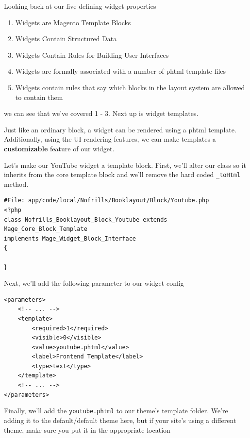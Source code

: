 \documentclass[oneside]{book}
\begin{document}
Looking back at our five defining widget properties

\begin{enumerate}
\item Widgets are Magento Template Blocks
\item Widgets Contain Structured Data
\item Widgets Contain Rules for Building User Interfaces
\item Widgets are formally associated with a number of phtml template files
\item Widgets contain rules that say which blocks in the layout system are allowed to contain them
\end{enumerate}


we can see that we've covered 1 - 3.  Next up is widget templates.

Just like an ordinary block, a widget can be rendered using a phtml template.  Additionally, using the UI rendering features, we can make templates a \textbf{customizable} feature of our widget.

Let's make our YouTube widget a template block.  First, we'll alter our class so it inherits from the core template block and we'll remove the hard coded \footnotesize\texttt{\_toHtml} \normalsize  method.  

\begin{lstlisting}
#File: app/code/local/Nofrills/Booklayout/Block/Youtube.php
<?php
class Nofrills_Booklayout_Block_Youtube extends Mage_Core_Block_Template
implements Mage_Widget_Block_Interface
{

}

\end{lstlisting}


Next, we'll add the following parameter to our widget config

\begin{lstlisting}
<parameters>
    <!-- ... -->
    <template>
        <required>1</required>
        <visible>0</visible>
        <value>youtube.phtml</value>
        <label>Frontend Template</label>
        <type>text</type>
    </template>
    <!-- ... -->
</parameters>   

\end{lstlisting}


Finally, we'll add the \footnotesize\texttt{youtube.phtml} \normalsize  to our theme's template folder.  We're adding it to the default/default theme here, but if your site's using a different theme, make sure you put it in the appropriate location
\end{document}
